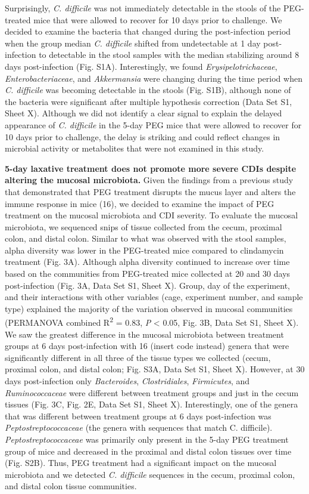 \documentclass[
  11pt,
]{article}
\begin{document}
Surprisingly, \emph{C. difficile} was not immediately detectable in the
stools of the PEG-treated mice that were allowed to recover for 10 days
prior to challenge. We decided to examine the bacteria that changed
during the post-infection period when the group median \emph{C.
difficile} shifted from undetectable at 1 day post-infection to
detectable in the stool samples with the median stabilizing around 8
days post-infection (Fig. S1A). Interestingly, we found
\emph{Erysipelotrichaceae}, \emph{Enterobacteriaceae}, and
\emph{Akkermansia} were changing during the time period when \emph{C.
difficile} was becoming detectable in the stools (Fig. S1B), although
none of the bacteria were significant after multiple hypothesis
correction (Data Set S1, Sheet X). Although we did not identify a clear
signal to explain the delayed appearance of \emph{C. difficile} in the
5-day PEG mice that were allowed to recover for 10 days prior to
challenge, the delay is striking and could reflect changes in microbial
activity or metabolites that were not examined in this study.

\textbf{5-day laxative treatment does not promote more severe CDIs
despite altering the mucosal microbiota.} Given the findings from a
previous study that demonstrated that PEG treatment disrupts the mucus
layer and alters the immune response in mice (16), we decided to examine
the impact of PEG treatment on the mucosal microbiota and CDI severity.
To evaluate the mucosal microbiota, we sequenced snips of tissue
collected from the cecum, proximal colon, and distal colon. Similar to
what was observed with the stool samples, alpha diversity was lower in
the PEG-treated mice compared to clindamycin treatment (Fig. 3A).
Although alpha diversity continued to increase over time based on the
communities from PEG-treated mice collected at 20 and 30 days
post-infection (Fig. 3A, Data Set S1, Sheet X). Group, day of the
experiment, and their interactions with other variables (cage,
experiment number, and sample type) explained the majority of the
variation observed in mucosal communities (PERMANOVA combined
R\textsuperscript{2} = 0.83, \emph{P} \textless{} 0.05, Fig. 3B, Data
Set S1, Sheet X). We saw the greatest difference in the mucosal
microbiota between treatment groups at 6 days post-infection with 16
(insert code instead) genera that were significantly different in all
three of the tissue types we collected (cecum, proximal colon, and
distal colon; Fig. S3A, Data Set S1, Sheet X). However, at 30 days
post-infection only \emph{Bacteroides}, \emph{Clostridiales},
\emph{Firmicutes}, and \emph{Ruminococcaceae} were different between
treatment groups and just in the cecum tissues (Fig. 3C, Fig. 2E, Data
Set S1, Sheet X). Interestingly, one of the genera that was different
between treatment groups at 6 days post-infection was
\emph{Peptostreptococcaceae} (the genera with sequences that match C.
difficile). \emph{Peptostreptococcaceae} was primarily only present in
the 5-day PEG treatment group of mice and decreased in the proximal and
distal colon tissues over time (Fig. S2B). Thus, PEG treatment had a
significant impact on the mucosal microbiota and we detected \emph{C.
difficile} sequences in the cecum, proximal colon, and distal colon
tissue communities.
\end{document}
